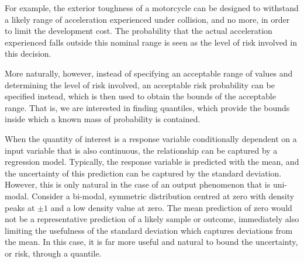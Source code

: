 \documentclass[twoside]{article} \usepackage{aistats2017}
\theoremstyle{definition}
\theoremstyle{theorem}
\begin{document}
	For example, the exterior toughness of a motorcycle can be designed to withstand a likely range of acceleration experienced under collision, and no more, in order to limit the development cost. The probability that the actual acceleration experienced falls outside this nominal range is seen as the level of risk involved in this decision.

	More naturally, however, instead of specifying an acceptable range of values and determining the level of risk involved, an acceptable risk probability can be specified instead, which is then used to obtain the bounds of the acceptable range. That is, we are interested in finding quantiles, which provide the bounds inside which a known mass of probability is contained.
	
	
%

	When the quantity of interest is a response variable conditionally dependent on a input variable that is also continuous, the relationship can be captured by a regression model. Typically, the response variable is predicted with the mean, and the uncertainty of this prediction can be captured by the standard deviation. However, this is only natural in the case of an output phenomenon that is uni-modal. Consider a bi-modal, symmetric distribution centred at zero with density peaks at $\pm1$ and a low density value at zero. The mean prediction of zero would not be a representative prediction of a likely sample or outcome, immediately also limiting the usefulness of the standard deviation which captures deviations from the mean. In this case, it is far more useful and natural to bound the uncertainty, or risk, through a quantile.
	
%
	
\end{document}
